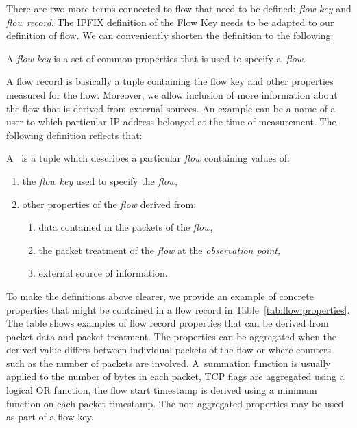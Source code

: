 There are two more terms connected to flow that need to be defined: \emph{flow key} and \emph{flow record}. The IPFIX definition of the Flow Key needs to be adapted to our definition of flow. We can conveniently shorten the definition to the following:

\begin{definition}\label{def:flow-key}

    A \emph{flow key} is a set of common properties that is used to specify a~\emph{flow}.

\end{definition}

A flow record is basically a tuple containing the flow key and other properties measured for the flow. Moreover, we allow inclusion of more information about the flow that is derived from external sources. An example can be a name of a user to which particular IP address belonged at the time of measurement. The following definition reflects that:

\begin{definition}\label{def:flow-record}

    A~\emph{} is a tuple which describes a particular \emph{flow} containing values of:

    \begin{enumerate}
        \item the \emph{flow key} used to specify the \emph{flow},
        \item other properties of the \emph{flow} derived from:
        \begin{enumerate}
            \item data contained in the packets of the \emph{flow},
            \item the packet treatment of the \emph{flow} at the \emph{observation point},
            \item external source of information.
        \end{enumerate}
    \end{enumerate}

\end{definition}

To make the definitions above clearer, we provide an example of concrete properties that might be contained in a flow record in Table~\ref{tab:flow.properties}. The table shows examples of flow record properties that can be derived from packet data and packet treatment. The properties can be aggregated when the derived value differs between individual packets of the flow or where counters such as the number of packets are involved. A~summation function is usually applied to the number of bytes in each packet, TCP flags are aggregated using a logical OR function, the flow start timestamp is derived using a minimum function on each packet timestamp. The non-aggregated properties may be used as part of a flow key.

